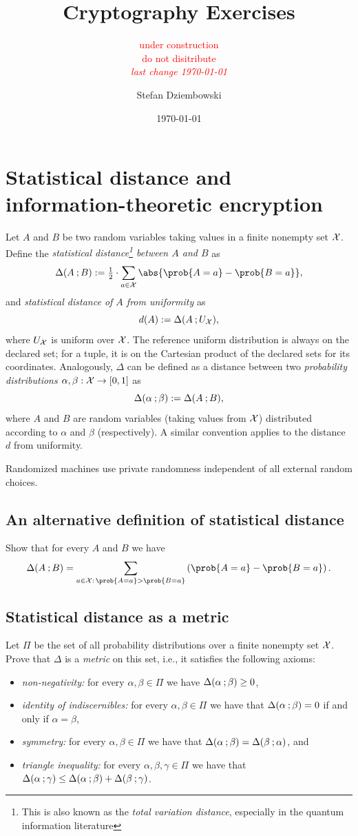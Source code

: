 \documentclass{llncs}
\title{Cryptography Exercises}
\subtitle{\textcolor{red}{under construction\\ do not disitribute\\   \scriptsize{\emph{last change \today}}}}
\author{Stefan Dziembowski}
\date{\today}
\institute{University of Warsaw}
\begin{document}
\maketitle




\section{Statistical distance and information-theoretic encryption}

Let $A$ and $B$ be two random variables taking values in a finite nonempty set ${\mathcal X}$. Define the \emph{statistical distance\footnote{This is also known as the \emph{total variation distance}, especially in the quantum information literature} between $A$ and $B$} as
\[
\SD{A}{B} := \half \cdot \sum_{a \in \cX} \abs{\prob{A=a} - \prob{B=a}},
\]
and \emph{statistical distance of $A$ from uniformity} as
\[
d(A) := \Delta(A \: ; U_{\mathcal X}),
\]
where $U_{\mathcal X}$ is uniform over ${\mathcal X}$. The reference uniform distribution is always on the declared set; for a tuple, it is on the Cartesian product of the declared sets for its coordinates. Analogously, $\Delta$ can be defined as a distance between two \emph{probability distributions $\alpha,\beta:{\mathcal X} \rightarrow [0,1]$} as
\[
\Delta(\alpha \: ; \beta) := \Delta(A \: ; B),
\]
where $A$ and $B$ are random variables (taking values from ${\mathcal X}$) distributed according to $\alpha$ and $\beta$ (respectively). A similar convention applies to the distance $d$ from uniformity.

Randomized machines use private randomness independent of all external random choices.



\subsection{An alternative definition of statistical distance}
Show that for every $A$ and $B$ we have
\[
\SD{A}{B} = \sum_{a \in \cX:\, \prob{A=a} > \prob{B=a}} \left(\prob{A=a} - \prob{B=a}\right).
\]

\subsection{Statistical distance as a metric}
Let $\Pi$ be the set of all probability distributions over a finite nonempty set ${\mathcal X}$. Prove that $\Delta$ is a \emph{metric} on this set, i.e., it satisfies the following axioms:
	\begin{itemize}
		\item \emph{non-negativity:} for every $\alpha,\beta \in \Pi$ we have $\Delta(\alpha \: ; \beta) \geq 0$,
		\item \emph{identity of indiscernibles:} for every $\alpha,\beta \in \Pi$ we have that $\Delta(\alpha \: ; \beta) = 0$ if and only if $\alpha = \beta$,
		\item \emph{symmetry:} for every $\alpha,\beta \in \Pi$ we have that $\Delta(\alpha \: ; \beta) = \Delta(\beta \: ; \alpha)$, and
		\item \emph{triangle inequality:} for every $\alpha,\beta,\gamma \in \Pi$ we have that $\Delta(\alpha \: ; \gamma) \leq \Delta(\alpha \: ; \beta) + \Delta(\beta \: ; \gamma)$.
	\end{itemize}
\end{document}
